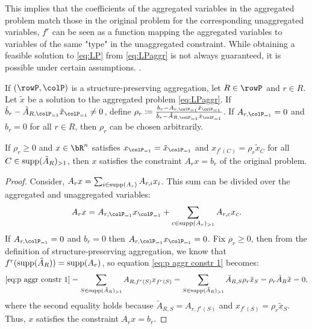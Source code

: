 {%
\vspace{0.5cm}
This implies that the coefficients of the aggregated variables in the aggregated problem match those
 in the original problem for the corresponding unaggregated variables, \(f^r\) can be seen as a 
 function mapping the aggregated variables to variables of the same "type" in the unaggregated
  constraint.
 While obtaining a feasible solution to \eqref{eq:LP} from \eqref{eq:LPaggr} is not always guaranteed,
  it is possible under certain assumptions.
.
\begin{observation}
\label{ob:aggrconstr}
If \((\rowP, \colP)\) is a structure-preserving aggregation, let \(R \in \rowP\) and \(r \in R\). Let \(\tilde{x}\) be a solution to the aggregated problem \eqref{eq:LPaggr}. 
If \(\tilde{b}_r - \tilde{A}_{R, \colP_{=1}} \tilde{x}_{\colP_{=1}} \neq 0\), define \(\rho_r \coloneqq \frac{b_r - A_{r, \colP_{=1}} \tilde{x}_{\colP_{=1}}}{\tilde{b}_r
 - \tilde{A}_{R, \colP_{=1}} \tilde{x}_{\colP_{=1}}}\). If \(A_{r, \colP_{=1}} = 0\) and \(b_r = 0\) for all \(r \in R\), then \(\rho_r\) can be chosen arbitrarily. 

If \(\rho_r \geq 0\) and \(x \in \bR^n\) satisfies \(x_{\colP_{=1}} = \tilde{x}_{\colP_{=1}}\) and \(x_{f^r(C)} = \rho_r \tilde{x}_C\) for all \(C \in \operatorname{supp}(\tilde{A}_R)_{>1}\), then \(x\) satisfies the constraint \(A_r x = b_r\) of the original problem.
\end{observation}

\begin{proof}

 Consider, \(A_r x = \sum_{i \in \operatorname{supp}(A_r)} A_{r,i} x_i\). 
  This sum can be divided over the aggregated and unaggregated variables:
  \begin{equation}
    \label{eq:p aggr constr 1}
    A_r x =  A_{r, \colP_{=1}} x_{\colP_{=1}} + \sum_{c \in \supp(A_r)_{>1}}  A_{r, c} x_{c}  .
  \end{equation}
  If \(A_{r, \colP_{=1}} = 0\) and \(b_r = 0\) then \( A_{r, \colP_{=1}} x_{\colP_{=1}} = 0\). Fix \(\rho_r \geq 0\), then
  from the definition of structure-preserving aggregation, we know that \(f^r(\operatorname{supp}(\tilde{A}_R)) = \operatorname{supp}(A_r)\), so equation \eqref{eq:p aggr constr 1} becomes:
  \begin{equation}
    \label{eq:p aggr constr 2}
    \eqref{eq:p aggr constr 1} = \sum_{S \in \operatorname{supp}(\tilde{A}_R)_{>1}} A_{R, f^r(S)} x_{f^r(S)} =  \sum_{S \in \operatorname{supp}(\tilde{A}_R)_{>1}} \tilde{A}_{R, S} \rho_r \tilde{x}_S  = \rho_r \tilde{A}_R \tilde{x} = 0,
  \end{equation}
  where the second equality holds because \(\tilde{A}_{R, S} = A_{r, f^r(S)}\) and \(x_{f^r(S)} = \rho_r \tilde{x}_S\). Thus, \(x\) satisfies the constraint \(A_r x = b_r\).
  

\end{proof}}
